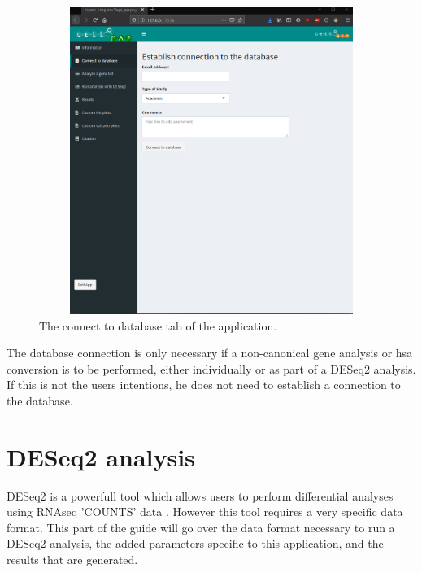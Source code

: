 \documentclass[11pt]{article}
\begin{document}
\begin{figure}[h!]
\centering
\includegraphics[width=15cm,height=10cm,keepaspectratio]{connect_DB.png}
\caption{The connect to database tab of the application.}
\label{fig:connect_DB}
\end{figure}

The database connection is only necessary if a non-canonical gene analysis or hsa conversion is to be performed, either individually or as part of a DESeq2 analysis. If this is not the users intentions, he does not need to establish a connection to the database.

\section{DESeq2 analysis}
DESeq2 is a powerfull tool which allows users to perform differential analyses using RNAseq 'COUNTS' data \cite{love2014moderated}. However this tool requires a very specific data format. This part of the guide will go over the data format necessary to run a DESeq2 analysis, the added parameters specific to this application, and the results that are generated.
\end{document}
